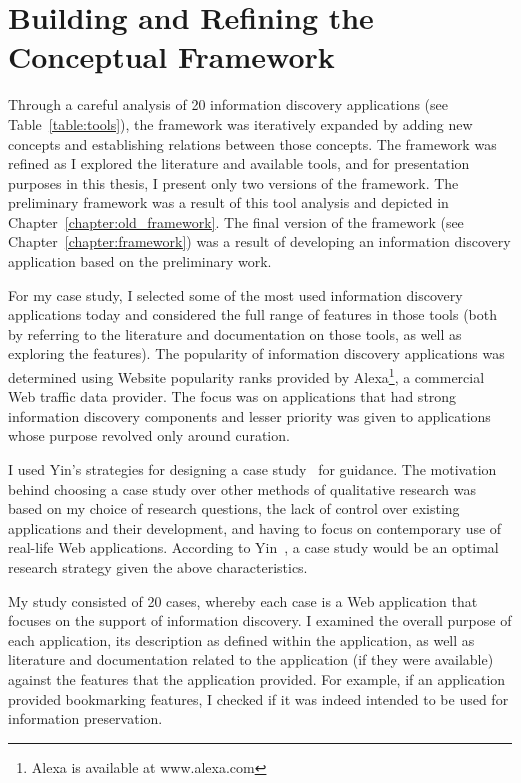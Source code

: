 {\section{Building and Refining the Conceptual Framework}
\label{section:building}
Through a careful analysis of 20 information discovery applications (see Table~\ref{table:tools}), the framework was iteratively expanded by adding new concepts and establishing relations between those concepts.  The framework was refined as I explored the literature and available tools, and for presentation purposes in this thesis, I present only two versions of the framework. The preliminary framework was a result of this tool analysis and depicted in Chapter~\ref{chapter:old_framework}. The final version of the framework (see Chapter~\ref{chapter:framework}) was a result of developing an information discovery application based on the preliminary work.    

For my case study, I selected some of the most used information discovery applications today and considered the full range of features in those tools (both by referring to the literature and documentation on those tools, as well as exploring the features). The popularity of information discovery applications was determined using Website popularity ranks provided by Alexa\footnote[1]{Alexa is available at www.alexa.com}, a commercial Web traffic data provider. The focus was on applications that had strong information discovery components and lesser priority was given to applications whose purpose revolved only around curation.

I used Yin's strategies for designing a case study~\cite{yin2014case} for guidance. The motivation behind choosing a case study over other methods of qualitative research was based on my choice of research questions, the lack of control over existing applications and their development, and having to focus on contemporary use of real-life Web applications. According to Yin~\cite{yin2014case}, a case study would be an optimal research strategy given the above characteristics.

My study consisted of 20 cases, whereby each case is a Web application that focuses on the support of information discovery. I examined the overall purpose of each application, its description as defined within the application, as well as literature and documentation related to the application (if they were available) against the features that the application provided. For example, if an application provided bookmarking features, I checked if it was indeed intended to be used for information preservation. 

}
